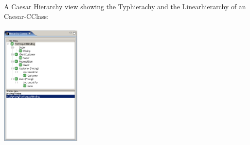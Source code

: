 A Caesar Hierarchy view showing the Typhierachy and the Linearhierarchy of an Caesar-CClass:\\\\
\includegraphics[width=0.30\textwidth]{images/hierarchy.png}
